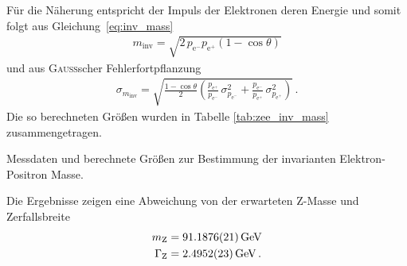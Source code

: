 \documentclass[11pt, a4paper]{article}
\numberwithin{equation}{section}
\begin{document}
Für die Näherung entspricht der Impuls der Elektronen deren Energie und somit folgt aus Gleichung~\eqref{eq:inv_mass}
\begin{align*}
	m_\mathrm{inv} = \sqrt{2 \, p_{\mathrm{e}^-} p_{\mathrm{e}^+} (1 - \cos\theta)}
\end{align*}
und aus \textsc{Gauß}scher Fehlerfortpflanzung
\begin{align*}
	\sigma_{m_\mathrm{inv}} = \sqrt{\frac{1 - \cos\theta}{2} \left( \frac{p_{\mathrm{e}^+}}{p_{\mathrm{e}^-}} \, \sigma_{p_{\mathrm{e}^-}}^2 + \frac{p_{\mathrm{e}^-}}{p_{\mathrm{e}^+}}  \, \sigma_{p_{\mathrm{e}^+}}^2\right)} \, \text{.}
\end{align*}
Die so berechneten Größen wurden in Tabelle \ref{tab:zee_inv_mass} zusammengetragen.
\begin{table}
	\centering
	\begin{subtable}{0.585\textheight}
		
		\vspace{0.6cm}
	\end{subtable}
	
	\begin{subtable}{0.585\textheight}
		
		\vspace{0.6cm}
	\end{subtable}
	
	\begin{subtable}{0.585\textheight}
		
	\end{subtable}
	
	\caption{Messdaten und berechnete Größen zur Bestimmung der invarianten Elektron-Positron Masse.}
	\label{tab:zee_inv_mass}
\end{table}
Die Ergebnisse zeigen eine Abweichung von der erwarteten $\mathrm{Z}$-Masse und Zerfallsbreite \cite{pdg}
\begin{align*}
	m_\mathrm{Z} &= \SI{91.1876 +- 0.0021}{\GeV} \\
	\Gamma_\mathrm{Z} &= \SI{2.4952 +- 0.0023}{\GeV} \, \text{.}
\end{align*}
\end{document}
